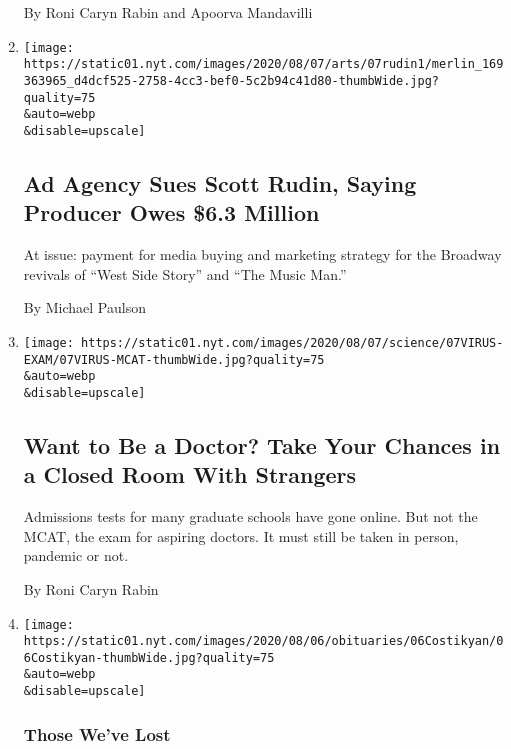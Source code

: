 \begin{enumerate}
  By Roni Caryn Rabin and Apoorva Mandavilli
\item
  \href{/2020/08/07/theater/scott-rudin-spotco-broadway-lawsuit.html}{}

  \texttt{[image: https://static01.nyt.com/images/2020/08/07/arts/07rudin1/merlin\_169363965\_d4dcf525-2758-4cc3-bef0-5c2b94c41d80-thumbWide.jpg?quality=75\\\&auto=webp\\\&disable=upscale]}

  \hypertarget{ad-agency-sues-scott-rudin-saying-producer-owes-63-million}{%
  \subsection{Ad Agency Sues Scott Rudin, Saying Producer Owes \$6.3
  Million}\label{ad-agency-sues-scott-rudin-saying-producer-owes-63-million}}

  At issue: payment for media buying and marketing strategy for the
  Broadway revivals of ``West Side Story'' and ``The Music Man.''

  By Michael Paulson
\item
  \href{/2020/08/07/health/coronavirus-exams-mcat.html}{}

  \texttt{[image: https://static01.nyt.com/images/2020/08/07/science/07VIRUS-EXAM/07VIRUS-MCAT-thumbWide.jpg?quality=75\\\&auto=webp\\\&disable=upscale]}

  \hypertarget{want-to-be-a-doctor-take-your-chances-in-a-closed-room-with-strangers}{%
  \subsection{Want to Be a Doctor? Take Your Chances in a Closed Room
  With
  Strangers}\label{want-to-be-a-doctor-take-your-chances-in-a-closed-room-with-strangers}}

  Admissions tests for many graduate schools have gone online. But not
  the MCAT, the exam for aspiring doctors. It must still be taken in
  person, pandemic or not.

  By Roni Caryn Rabin
\item
  \href{/2020/08/07/obituaries/barbara-costikyan-dead-coronavirus.html}{}

  \texttt{[image: https://static01.nyt.com/images/2020/08/06/obituaries/06Costikyan/06Costikyan-thumbWide.jpg?quality=75\\\&auto=webp\\\&disable=upscale]}

  \hypertarget{those-weve-lost}{%
  \subsubsection{Those We've Lost}\label{those-weve-lost}}


\end{enumerate}
